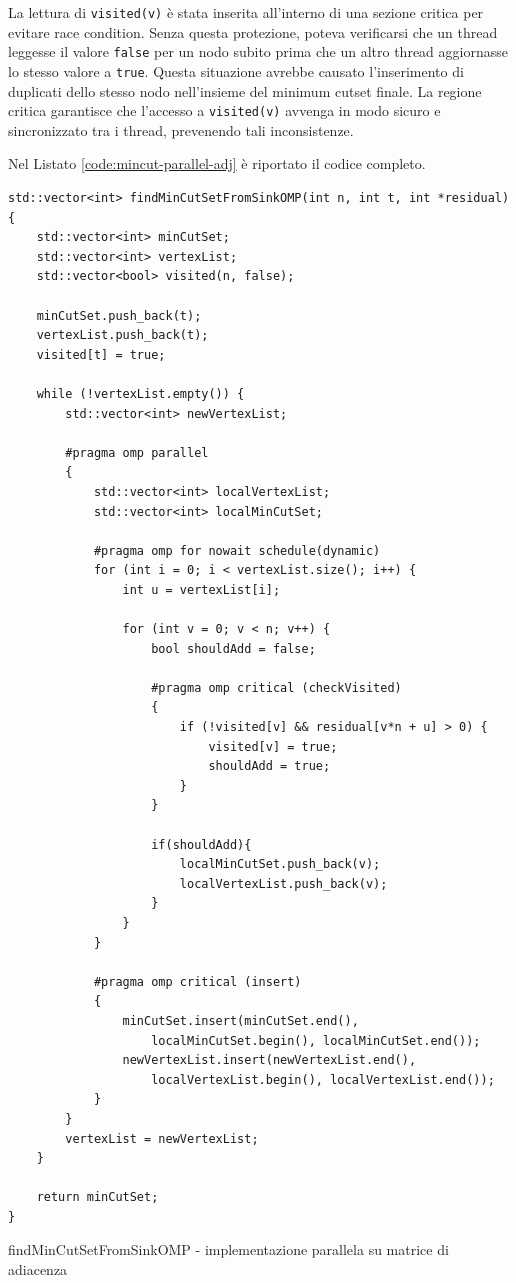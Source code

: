             La lettura di \verb|visited(v)| è stata inserita all'interno di una sezione critica per evitare race condition. Senza questa protezione, poteva verificarsi che un thread leggesse il valore \verb|false| per un nodo subito prima che un altro thread aggiornasse lo stesso valore a \verb|true|. Questa situazione avrebbe causato l'inserimento di duplicati dello stesso nodo nell'insieme del minimum cutset finale. La regione critica garantisce che l'accesso a \verb|visited(v)| avvenga in modo sicuro e sincronizzato tra i thread, prevenendo tali inconsistenze.
            
            Nel Listato \ref{code:mincut-parallel-adj} è riportato il codice completo.

            \begin{listing}
            \begin{verbatim}
std::vector<int> findMinCutSetFromSinkOMP(int n, int t, int *residual){
    std::vector<int> minCutSet;
    std::vector<int> vertexList;
    std::vector<bool> visited(n, false);

    minCutSet.push_back(t);
    vertexList.push_back(t);
    visited[t] = true;

    while (!vertexList.empty()) {
        std::vector<int> newVertexList;
        
        #pragma omp parallel
        {
            std::vector<int> localVertexList;
            std::vector<int> localMinCutSet;

            #pragma omp for nowait schedule(dynamic)
            for (int i = 0; i < vertexList.size(); i++) {
                int u = vertexList[i];

                for (int v = 0; v < n; v++) {
                    bool shouldAdd = false;

                    #pragma omp critical (checkVisited)
                    {
                        if (!visited[v] && residual[v*n + u] > 0) {                         
                            visited[v] = true;
                            shouldAdd = true;
                        }
                    }

                    if(shouldAdd){
                        localMinCutSet.push_back(v);
                        localVertexList.push_back(v);
                    }
                }
            }

            #pragma omp critical (insert)
            {
                minCutSet.insert(minCutSet.end(), 
                    localMinCutSet.begin(), localMinCutSet.end());
                newVertexList.insert(newVertexList.end(), 
                    localVertexList.begin(), localVertexList.end());
            }
        }
        vertexList = newVertexList;
    }

    return minCutSet;
}
            \end{verbatim}
            \caption{findMinCutSetFromSinkOMP - implementazione parallela su matrice di adiacenza}\label{code:mincut-parallel-adj}
            \end{listing}
            
